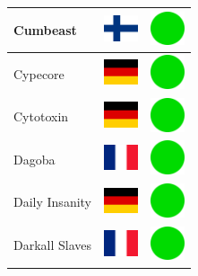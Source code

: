 \documentclass[12pt, a4paper, twoside]{report}
\begin{document}
\begin{center}
\begin{longtable}{|p{5cm}|p{2cm}|p{2cm}|}
Cumbeast & \includegraphics[width=1cm]{4x3/fi} & \includegraphics[width=1cm]{likes/y} \\ \hline
Cypecore & \includegraphics[width=1cm]{4x3/de} & \includegraphics[width=1cm]{likes/y} \\ \hline
Cytotoxin & \includegraphics[width=1cm]{4x3/de} & \includegraphics[width=1cm]{likes/y} \\ \hline
Dagoba & \includegraphics[width=1cm]{4x3/fr} & \includegraphics[width=1cm]{likes/y} \\ \hline
Daily Insanity & \includegraphics[width=1cm]{4x3/de} & \includegraphics[width=1cm]{likes/y} \\ \hline
Darkall Slaves & \includegraphics[width=1cm]{4x3/fr} & \includegraphics[width=1cm]{likes/y} \\ \hline

\end{longtable}
\end{center}
\end{document}

